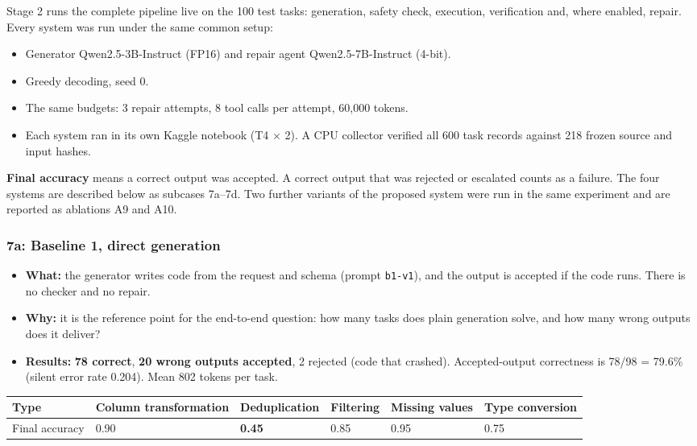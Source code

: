 \documentclass[11pt]{article}
\providecommand{\tightlist}{\setlength{\itemsep}{0pt}\setlength{\parskip}{0pt}}
\begin{document}
Stage 2 runs the complete pipeline live on the 100 test tasks:
generation, safety check, execution, verification and, where enabled,
repair. Every system was run under the same common setup:

\begin{itemize}
\tightlist
\item
  Generator Qwen2.5-3B-Instruct (FP16) and repair agent
  Qwen2.5-7B-Instruct (4-bit).
\item
  Greedy decoding, seed 0.
\item
  The same budgets: 3 repair attempts, 8 tool calls per attempt, 60,000
  tokens.
\item
  Each system ran in its own Kaggle notebook (T4 × 2). A CPU collector
  verified all 600 task records against 218 frozen source and input
  hashes.
\end{itemize}

\textbf{Final accuracy} means a correct output was accepted. A correct
output that was rejected or escalated counts as a failure. The four
systems are described below as subcases 7a--7d. Two further variants of
the proposed system were run in the same experiment and are reported as
ablations A9 and A10.

\subsubsection{7a: Baseline 1, direct generation}

\begin{itemize}
\tightlist
\item
  \textbf{What:} the generator writes code from the request and schema
  (prompt \texttt{b1-v1}), and the output is accepted if the code runs.
  There is no checker and no repair.
\item
  \textbf{Why:} it is the reference point for the end-to-end question:
  how many tasks does plain generation solve, and how many wrong outputs
  does it deliver?
\item
  \textbf{Results:} \textbf{78 correct}, \textbf{20 wrong outputs
  accepted}, 2 rejected (code that crashed). Accepted-output correctness
  is 78/98 = 79.6\% (silent error rate 0.204). Mean 802 tokens per task.
\end{itemize}

\begin{table}[!tp]
\centering\footnotesize\setlength{\tabcolsep}{3pt}\renewcommand{\arraystretch}{1.1}
\begin{adjustbox}{max width=\textwidth}\begin{tabular}{llllll}
\toprule
\textbf{Type} & \textbf{Column transformation} & \textbf{Deduplication} & \textbf{Filtering} & \textbf{Missing values} & \textbf{Type conversion} \\
\midrule
Final accuracy & 0.90 & \textbf{0.45} & 0.85 & 0.95 & 0.75 \\
\bottomrule
\end{tabular}\end{adjustbox}
\end{table}
\end{document}
